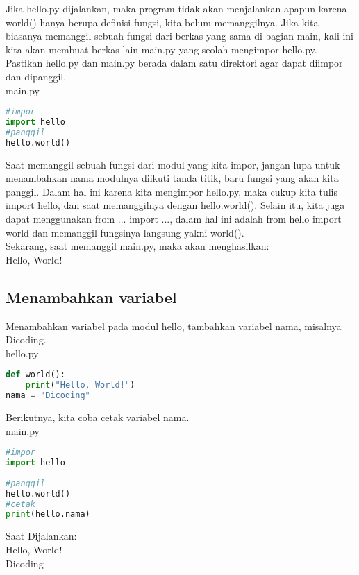 Jika hello.py dijalankan, maka program tidak akan menjalankan apapun karena world() hanya berupa definisi fungsi, kita belum memanggilnya. Jika kita biasanya memanggil sebuah fungsi dari berkas yang sama di bagian main, kali ini kita akan membuat berkas lain main.py yang seolah mengimpor hello.py. Pastikan hello.py dan main.py berada dalam satu direktori agar dapat diimpor dan dipanggil.\\

main.py
\begin{lstlisting}[language=Python]
#impor
import hello
#panggil
hello.world()
\end{lstlisting}

Saat memanggil sebuah fungsi dari modul yang kita impor, jangan lupa untuk menambahkan nama modulnya diikuti tanda titik, baru fungsi yang akan kita panggil. Dalam hal ini karena kita mengimpor hello.py, maka cukup kita tulis import hello, dan saat memanggilnya dengan hello.world(). Selain itu, kita juga dapat menggunakan from ... import ..., dalam hal ini adalah from hello import world dan memanggil fungsinya langsung yakni world().\\

Sekarang, saat memanggil main.py, maka akan menghasilkan:\\

Hello, World!\\

\subsection{Menambahkan variabel}
Menambahkan variabel pada modul hello, tambahkan variabel nama, misalnya Dicoding.\\

hello.py
\begin{lstlisting}[language=Python]
def world():
    print("Hello, World!")
nama = "Dicoding"
\end{lstlisting}

Berikutnya, kita coba cetak variabel nama.\\

main.py
\begin{lstlisting}[language=Python]
#impor
import hello
 
#panggil
hello.world()
#cetak
print(hello.nama)
\end{lstlisting}

Saat Dijalankan:\\

Hello, World!\\
Dicoding\\

